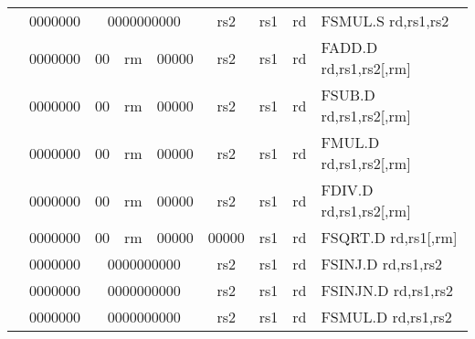 \begin{table}[p]
\begin{small}
\begin{center}
\begin{tabular}{rcccccccccl}
&
\multicolumn{1}{|c|}{0000000} &
\multicolumn{5}{c|}{0000000000} &
\multicolumn{1}{c|}{rs2} &
\multicolumn{1}{c|}{rs1} &
\multicolumn{1}{c|}{rd} & FSMUL.S rd,rs1,rs2 \\
\cline{2-10}
  

&
\multicolumn{1}{|c|}{0000000} &
\multicolumn{1}{c|}{00} &
\multicolumn{2}{c|}{rm} &
\multicolumn{2}{c|}{00000} &
\multicolumn{1}{c|}{rs2} &
\multicolumn{1}{c|}{rs1} &
\multicolumn{1}{c|}{rd} & FADD.D rd,rs1,rs2[,rm] \\
\cline{2-10}
  

&
\multicolumn{1}{|c|}{0000000} &
\multicolumn{1}{c|}{00} &
\multicolumn{2}{c|}{rm} &
\multicolumn{2}{c|}{00000} &
\multicolumn{1}{c|}{rs2} &
\multicolumn{1}{c|}{rs1} &
\multicolumn{1}{c|}{rd} & FSUB.D rd,rs1,rs2[,rm] \\
\cline{2-10}
  

&
\multicolumn{1}{|c|}{0000000} &
\multicolumn{1}{c|}{00} &
\multicolumn{2}{c|}{rm} &
\multicolumn{2}{c|}{00000} &
\multicolumn{1}{c|}{rs2} &
\multicolumn{1}{c|}{rs1} &
\multicolumn{1}{c|}{rd} & FMUL.D rd,rs1,rs2[,rm] \\
\cline{2-10}
  

&
\multicolumn{1}{|c|}{0000000} &
\multicolumn{1}{c|}{00} &
\multicolumn{2}{c|}{rm} &
\multicolumn{2}{c|}{00000} &
\multicolumn{1}{c|}{rs2} &
\multicolumn{1}{c|}{rs1} &
\multicolumn{1}{c|}{rd} & FDIV.D rd,rs1,rs2[,rm] \\
\cline{2-10}
  

&
\multicolumn{1}{|c|}{0000000} &
\multicolumn{1}{c|}{00} &
\multicolumn{2}{c|}{rm} &
\multicolumn{2}{c|}{00000} &
\multicolumn{1}{c|}{00000} &
\multicolumn{1}{c|}{rs1} &
\multicolumn{1}{c|}{rd} & FSQRT.D rd,rs1[,rm] \\
\cline{2-10}
  

&
\multicolumn{1}{|c|}{0000000} &
\multicolumn{5}{c|}{0000000000} &
\multicolumn{1}{c|}{rs2} &
\multicolumn{1}{c|}{rs1} &
\multicolumn{1}{c|}{rd} & FSINJ.D rd,rs1,rs2 \\
\cline{2-10}
  

&
\multicolumn{1}{|c|}{0000000} &
\multicolumn{5}{c|}{0000000000} &
\multicolumn{1}{c|}{rs2} &
\multicolumn{1}{c|}{rs1} &
\multicolumn{1}{c|}{rd} & FSINJN.D rd,rs1,rs2 \\
\cline{2-10}
  

&
\multicolumn{1}{|c|}{0000000} &
\multicolumn{5}{c|}{0000000000} &
\multicolumn{1}{c|}{rs2} &
\multicolumn{1}{c|}{rs1} &
\multicolumn{1}{c|}{rd} & FSMUL.D rd,rs1,rs2 \\
\cline{2-10}
  


\end{tabular}
\end{center}
\end{small}
\end{table}
